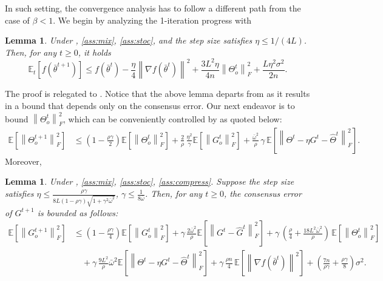 \documentclass[10pt]{article} %
\theoremstyle{plain}
\newtheorem{lemma}[theorem]{Lemma}
\theoremstyle{definition}
\theoremstyle{remark}
\newcommand{\prm}{\theta}
\newcommand{\bw}{\bar{\omega}}
\newcommand{\avgtheta}{\bar{\prm}}
\newcommand{\norm}[1]{\left\| #1 \right\|}
\newcommand{\nl}{\nonumber\\}
\newcommand{\hatTheta}{\widehat{\Theta}}
\newcommand{\hatG}{\widehat{G}}
\begin{document}
In such setting, the convergence analysis has to follow a different path from the case of $\beta < 1$. We begin by analyzing the 1-iteration progress with
\begin{lemma} \label{lem:onestep}
    Under , \ref{ass:mix}, \ref{ass:stoc}, and the step size satisfies $\eta \leq 1/(4L)$. Then, for any $t \geq 0$, it holds
    \begin{equation} \label{eq:onestep}
    \mathbb{E}_t [f(\avgtheta^{t+1})] \leq  f(\avgtheta^t) -\frac{\eta}{4}\norm{\nabla f(\avgtheta^t)}^2 + \frac{3L^2\eta}{4n}\norm{\Theta_o^t }_F^2 + \frac{ L \eta^2 \sigma^2}{2n}.
    \end{equation} 
\end{lemma}
The proof is relegated to . Notice that the above lemma departs from  as it results in a bound that depends only on the consensus error. 
Our next endeavor is to bound $\norm{\Theta_o^t }_F^2$, which can be conveniently controlled by  as quoted below:
\begin{align}
    \mathbb{E} [\norm{\Theta_o^{t+1}}_F^2] & \leq (1-\frac{\rho\gamma}{2}) \mathbb{E} [\norm{\Theta_o^t}_F^2] + \frac{2}{\rho} \, \frac{\eta^2}{\gamma} \mathbb{E} [ \norm{G_o^t}_F^2 ] + \frac{\bw^2}{\rho} \, \gamma \, \mathbb{E} \left[ \norm{\Theta^t - \eta G^t - \hatTheta^t}^2_F \right].
\end{align}
Moreover, 
\begin{lemma} \label{lemma:g_cons}
    Under , \ref{ass:mix}, \ref{ass:stoc}, \ref{ass:compress}. Suppose the step size satisfies $\eta \leq \frac{ \rho \gamma }{ 8L (1-\rho\gamma) \sqrt{1 + \gamma^2 \bw^2} }$, $\gamma \leq \frac{1}{8 \bw}$. Then, for any $t \geq 0$, the consensus error of $G^{t+1}$ is bounded as follows:
    \begin{align*}
    \mathbb{E} \left[ \norm{G_o^{t+1}}_F^2 \right] & \leq \left( 1 - \frac{ \rho \gamma }{4} \right) \mathbb{E} \left[ \norm{ G_o^t }_F^2 \right] + \gamma \, \frac{ 2 \bw^2}{ \rho } \mathbb{E} \left[ \norm{ G^t - \hatG^t }_F^2 \right] + \gamma \, \left( \frac{\rho}{4} + \frac{18 L^2 \bw^2}{\rho} \right) \, \mathbb{E} \left[ \norm{ \Theta_o^t}_F^2 \right] \nl 
    & \quad + \gamma \, \frac{9 L^2}{ \rho } \bw^2 \mathbb{E} \left[ \norm{ \Theta^t - \eta G^t - \hatTheta^t }_F^2 \right] + \gamma \, \frac{ \rho n}{4} \, \mathbb{E} \left[ \norm{ \nabla f( \avgtheta^t ) }^2 \right] + \left( \frac{7n }{\rho \gamma} + \frac{\rho \gamma}{8} \right) \sigma^2 .
    \end{align*}
\end{lemma}
\end{document}
